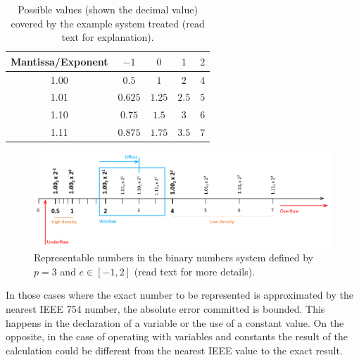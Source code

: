 \begin{table}
    \centering
    \begin{tabular}{| c | c | c | c | c | }
        \hline
        Mantissa/Exponent   & $-1$ & $0$  & $1$  &   $2$  \\ \hline
        1.00                & $0.5$ & $1$  & $2$  &   $4$  \\ \hline
        1.01                & $0.625$ & $1.25$  & $2.5$  &   $5$  \\ \hline
        1.10                & $0.75$ & $1.5$  & $3$  &   $6$  \\ \hline
        1.11                & $0.875$ & $1.75$  & $3.5$  &   $7$  \\ \hline
    \end{tabular}
    \caption{Possible values (shown the decimal value) covered by the example system treated (read text for explanation).}
    \label{tab:PossibleValues}
\end{table}

\begin{figure}[h]
    \centering
    \includegraphics[width= \textwidth]{./doc/Figures/DensityNumbers.png}
    \caption{Representable numbers in the binary numbers system defined by $p = 3$ and $e\in\left[-1, 2  \right]$ (read text for more details).}
    \label{fig:DensityNumbers}
\end{figure}


In those cases where the exact number to be represented is approximated by the nearest IEEE 754 number, the absolute error committed is bounded. This happens in the declaration of a variable or the use of a constant value. On the opposite, in the case of operating with variables and constants the result of the calculation could be different from the nearest IEEE value to the exact result. 

